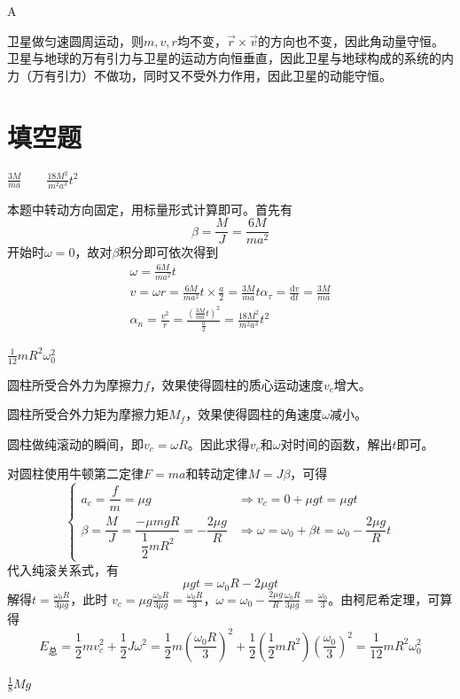 \documentclass[b5paper,opensource,sourcefont,parskip]{qyxf-book}
\newcommand{\di}[1]{\mathrm{d}#1}
\newcommand{\dy}[2]{\frac{\di{#1}}{\di{#2}}}
\begin{document}
A

\solve 卫星做匀速圆周运动，则$ m,v,r $均不变，$ \vec{r}\times\vec{v} $的方向也不变，因此角动量守恒。卫星与地球的万有引力与卫星的运动方向恒垂直，因此卫星与地球构成的系统的内力（万有引力）不做功，同时又不受外力作用，因此卫星的动能守恒。

\section{填空题}
$\frac{3M}{ma} \hspace{2em} \frac{18M^2}{m^2a^3}t^2$

\solve 本题中转动方向固定，用标量形式计算即可。首先有
\[\beta=\frac{M}{J}=\frac{6M}{ma^2}\]
开始时$\omega=0$，故对$\beta$积分即可依次得到
\begin{gather*}
\omega=\frac{6M}{ma^2}t\\
v=\omega r=\frac{6M}{ma^2}t\times\frac{a}{2}=\frac{3M}{ma}t
\alpha_{\tau}=\dy{v}{t}=\frac{3M}{ma}\\
\alpha_n=\frac{v^2}{r}=\frac{\left(\frac{3M}{ma}t\right)^2}{\frac{a}{2}}=\frac{18M^2}{m^2a^3}t^2
\end{gather*}


$\frac{1}{12}mR^2\omega_0^2$

\solve 圆柱所受合外力为摩擦力$f$，效果使得圆柱的质心运动速度$ v_c $增大。

圆柱所受合外力矩为摩擦力矩$ M_f $，效果使得圆柱的角速度$ \omega $减小。

圆柱做纯滚动的瞬间，即$ v_c=\omega R $。因此求得$ v_c $和$ \omega $对时间的函数，解出$ t $即可。

对圆柱使用牛顿第二定律$F=ma$和转动定律$M=J\beta$，可得
\[\begin{cases}
a_c=\dfrac{f}{m}=\mu g&\Rightarrow v_c=0+\mu gt=\mu gt\\[0.5cm]
\beta=\dfrac{M}{J}=\dfrac{-\mu mgR}{\dfrac{1}{2}mR^2}=-\dfrac{2\mu g}{R}&\Rightarrow\omega=\omega_0+\beta t=\omega_0-\dfrac{2\mu g}{R}t
\end{cases}\]
代入纯滚关系式，有
\[\mu gt=\omega_0R-2\mu gt\]
解得$t=\frac{\omega_0R}{3\mu g}$，此时
$v_c=\mu g\frac{\omega_0R}{3\mu g}=\frac{\omega_0R}{3}$，$\omega=\omega_0-\frac{2\mu g}{R}\frac{\omega_0R}{3\mu g}=\frac{\omega_0}{3}$。由柯尼希定理，可算得
\[E_{\text{总}}=\frac{1}{2}mv_c^2+\frac{1}{2}J\omega^2=\frac{1}{2}m\left(\frac{\omega_0R}{3}\right)^2+\frac{1}{2}\left(\frac{1}{2}mR^2\right)\left(\frac{\omega_0}{3}\right)^2=\frac{1}{12}mR^2\omega_0^2\]

$\frac{1}{8}Mg$
\end{document}
